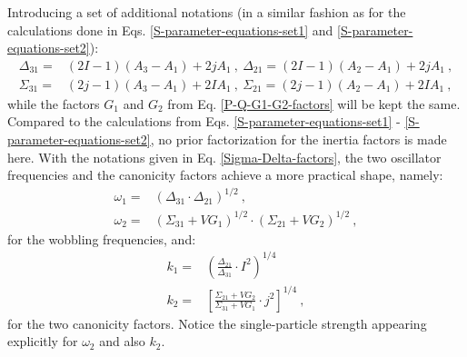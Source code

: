 Introducing a set of additional notations (in a similar fashion as for the calculations done in Eqs. \ref{S-parameter-equations-set1} and \ref{S-parameter-equations-set2}):
\begin{align}
    \Delta_{31}=&(2I-1)(A_3-A_1)+2jA_1\ ,\ \Delta_{21}=(2I-1)(A_2-A_1)+2jA_1\ ,\nonumber\\
    \Sigma_{31}=&(2j-1)(A_3-A_1)+2IA_1\ ,\ \Sigma_{21}=(2j-1)(A_2-A_1)+2IA_1\ ,
    \label{Sigma-Delta-factors}
\end{align}
while the factors $G_1$ and $G_2$ from Eq. \ref{P-Q-G1-G2-factors} will be kept the same. Compared to the calculations from Eqs. \ref{S-parameter-equations-set1} - \ref{S-parameter-equations-set2}, no prior factorization for the inertia factors is made here. With the notations given in Eq. \ref{Sigma-Delta-factors}, the two oscillator frequencies and the canonicity factors achieve a more practical shape, namely:
\begin{align}
    \omega_1=&\left(\Delta_{31}\cdot\Delta_{21}\right)^{1/2}\ ,\nonumber\\
    \omega_2=&\left(\Sigma_{31}+VG_1\right)^{1/2}\cdot\left(\Sigma_{21}+VG_2\right)^{1/2}\ ,
\end{align}
for the wobbling frequencies, and:
\begin{align}
    k_1=&\left(\frac{\Delta_{21}}{\Delta_{31}}\cdot I^2\right)^{1/4}\, \nonumber\\
    k_2=&\left[\frac{\Sigma_{21}+VG_2}{\Sigma_{31}+VG_1}\cdot j^2\right]^{1/4}\ ,
\end{align}
for the two canonicity factors. Notice the single-particle strength appearing explicitly for $\omega_2$ and also $k_2$.

